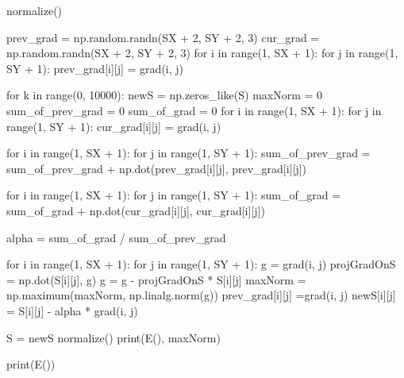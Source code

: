 \documentclass[ 12pt,x11names]{article}
\begin{document}
\begin{python}
normalize()

prev_grad =  np.random.randn(SX + 2, SY + 2, 3)
cur_grad = np.random.randn(SX + 2, SY + 2, 3)
for i in range(1, SX + 1):
    for j in range(1, SY + 1):
        prev_grad[i][j] = grad(i, j)

for k in range(0, 10000):
    newS = np.zeros_like(S)
    maxNorm = 0
    sum_of_prev_grad = 0
    sum_of_grad  =  0
    for i in range(1, SX + 1):
        for j in range(1, SY + 1):
            cur_grad[i][j] = grad(i,  j)

    for i in range(1, SX + 1):
        for j in range(1, SY + 1):
            sum_of_prev_grad = sum_of_prev_grad + np.dot(prev_grad[i][j], prev_grad[i][j])

    for i in range(1, SX + 1):
        for j in range(1, SY + 1):
            sum_of_grad = sum_of_grad + np.dot(cur_grad[i][j], cur_grad[i][j])

    alpha = sum_of_grad / sum_of_prev_grad

    for i in range(1, SX + 1):
        for j in range(1, SY + 1):
            g = grad(i,  j)
            projGradOnS = np.dot(S[i][j], g)
            g = g - projGradOnS * S[i][j]
            maxNorm = np.maximum(maxNorm, np.linalg.norm(g))
            prev_grad[i][j] =grad(i, j)
            newS[i][j] = S[i][j] - alpha * grad(i, j)

    S = newS
    normalize()
    print(E(), maxNorm)

print(E())

 \end{python}
\newpage
\end{document}
